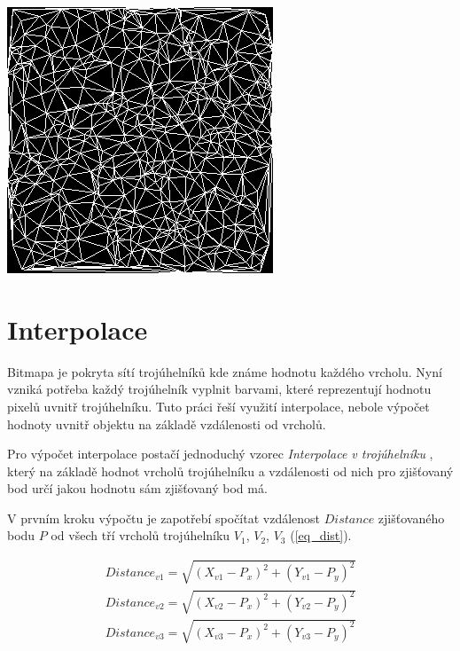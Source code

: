 \documentclass[czech,bachelor,dept460,male,csharp,cpdeclaration]{diploma}
\begin{document}
	\begin{center}
		\includegraphics{Data/bmp_triangulace.png}
	\end{center}
	
	\section{Interpolace}
	
	Bitmapa je pokryta sítí trojúhelníků kde známe hodnotu každého vrcholu. Nyní vzniká potřeba každý trojúhelník vyplnit barvami, které reprezentují hodnotu pixelů uvnitř trojúhelníku. Tuto práci řeší využití interpolace, nebole výpočet hodnoty uvnitř objektu na základě vzdálenosti od vrcholů.
	
	Pro výpočet interpolace postačí jednoduchý vzorec \emph{Interpolace v trojúhelníku} \cite{interp}, který na základě hodnot vrcholů trojúhelníku a vzdálenosti od nich pro zjišťovaný bod určí jakou hodnotu sám zjišťovaný bod má.
	
	
	V prvním kroku výpočtu je zapotřebí spočítat vzdálenost $Distance$ zjišťovaného bodu $P$ od všech tří vrcholů trojúhelníku $V_1$, $V_2$, $V_3$ (\ref{eq_dist}). 
	
	\begin{equation}
		\begin{split}
			Distance_{v1} =\sqrt{(X_{v1}-P_x)^2+(Y_{v1}-P_y)^2} \\
			Distance_{v2} =\sqrt{(X_{v2}-P_x)^2+(Y_{v2}-P_y)^2} \\
			Distance_{v3} =\sqrt{(X_{v3}-P_x)^2+(Y_{v3}-P_y)^2}
		\end{split}\label{eq_dist}
	\end{equation}
	
\end{document}
